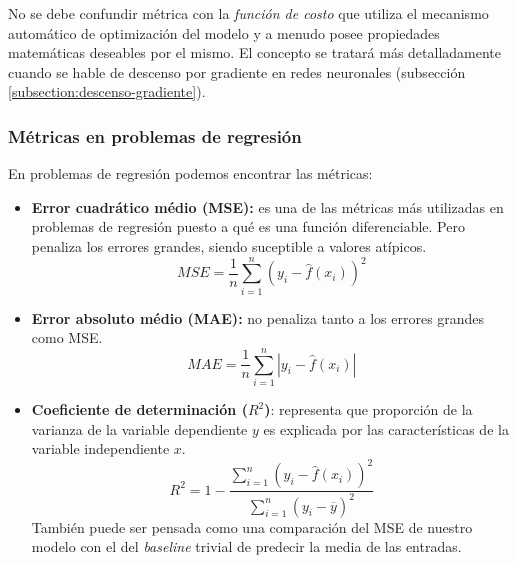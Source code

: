 No se debe confundir métrica con la \textit{función de costo} que utiliza el mecanismo automático de optimización del modelo y a menudo posee propiedades matemáticas deseables por el mismo. El concepto se tratará más detalladamente cuando se hable de descenso por gradiente en redes neuronales  (subsección \ref{subsection:descenso-gradiente}).

\subsubsection{Métricas en problemas de regresión}
En problemas de regresión podemos encontrar las métricas:
\begin{itemize}
    \item \textbf{Error cuadrático médio (MSE):} es una de las métricas más utilizadas en problemas de regresión puesto a qué es una función diferenciable. Pero penaliza los errores grandes, siendo suceptible a valores atípicos.
    \begin{equation*}
        MSE = \frac{1}{n} \sum_{i=1}^n ( y_i - \hat{f}(x_i) )^2
    \end{equation*}
    \item \textbf{Error absoluto médio (MAE): } no penaliza tanto a los errores grandes como MSE.
    \begin{equation*}
        MAE = \frac{1}{n} \sum_{i=1}^n | y_i - \hat{f}(x_i) | 
    \end{equation*}
    \item \textbf{Coeficiente de determinación ($R^2$)}: representa que proporción de la varianza de la variable dependiente $y$ es explicada por las características de la variable independiente $x$.
    \begin{equation*}
        R^2 = 1 - \frac{\sum_{i=1}^n ( y_i - \hat{f}(x_i) )^2}{\sum_{i=1}^n ( y_i - \overline{y} )^2} 
    \end{equation*}
    También puede ser pensada como una comparación del MSE de nuestro modelo con el del \textit{baseline} trivial de predecir la media de las entradas.
\end{itemize}


